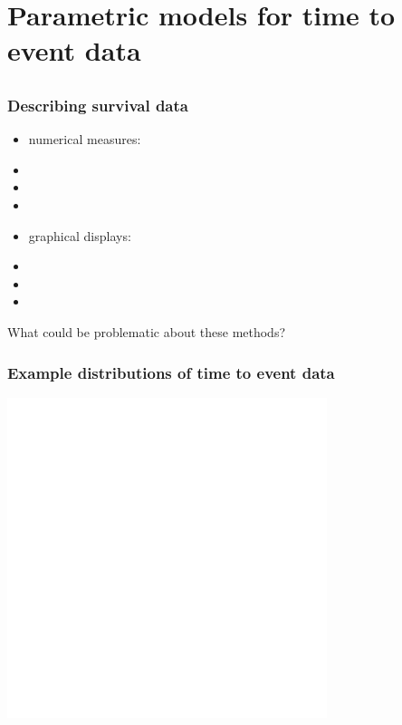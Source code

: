 \section[Parametric models]{Parametric models for time to event data}
\subsection{}
\begin{frame}
\end{frame}

\begin{frame}
\frametitle{Describing survival data}
\begin{itemize}
\item numerical measures:
\item[] %
\item[]
\item[]
\item graphical displays:
\item[] %
\item[]
\item[]
\end{itemize}
What could be problematic about these methods?
\vskip40pt
\end{frame}

\begin{frame}
\frametitle{Example distributions of time to event data}
\includegraphics[width=0.7\textwidth]{Figures/exampletimes.png}\\
\end{frame}

